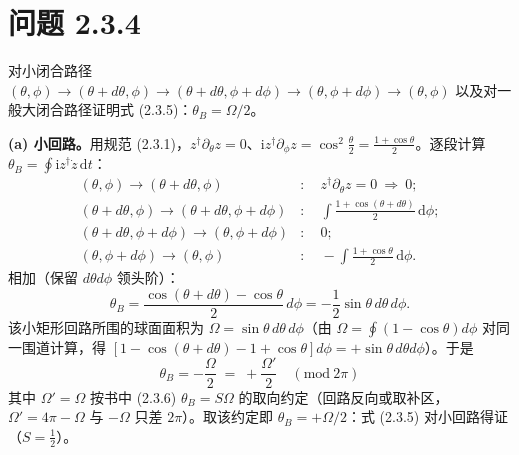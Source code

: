 \section*{问题 2.3.4}
\begin{problem}
对小闭合路径 $(\theta,\phi)\to(\theta+d\theta,\phi)\to(\theta+d\theta,\phi+d\phi)\to(\theta,\phi+d\phi)\to(\theta,\phi)$ 以及对一般大闭合路径证明式 (2.3.5)：$\theta_B=\Omega/2$。
\end{problem}
\solution
\textbf{(a) 小回路。}用规范 (2.3.1)，$z^\dagger\partial_\theta z=0$、$\mathrm{i}z^\dagger\partial_\phi z=\cos^2\frac\theta2=\frac{1+\cos\theta}2$。逐段计算 $\theta_B=\oint\mathrm{i}z^\dagger\dot z\,\mathrm{d}t$：
\begin{align*}
(\theta,\phi)\to(\theta+d\theta,\phi)&:\quad z^\dagger\partial_\theta z=0\ \Rightarrow\ 0;\\
(\theta+d\theta,\phi)\to(\theta+d\theta,\phi+d\phi)&:\quad \int\frac{1+\cos(\theta+d\theta)}2\,\mathrm{d}\phi;\\
(\theta+d\theta,\phi+d\phi)\to(\theta,\phi+d\phi)&:\quad 0;\\
(\theta,\phi+d\phi)\to(\theta,\phi)&:\quad -\int\frac{1+\cos\theta}2\,\mathrm{d}\phi .
\end{align*}
相加（保留 $d\theta d\phi$ 领头阶）：
\begin{equation*}
\theta_B=\frac{\cos(\theta+d\theta)-\cos\theta}{2}\,d\phi=-\frac12\sin\theta\,d\theta\,d\phi .
\end{equation*}
该小矩形回路所围的球面面积为 $\Omega=\sin\theta\,d\theta\,d\phi$（由 $\Omega=\oint(1-\cos\theta)d\phi$ 对同一围道计算，得 $[1-\cos(\theta+d\theta)-1+\cos\theta]d\phi=+\sin\theta\,d\theta d\phi$）。于是
\begin{equation*}
\boxed{\;\theta_B=-\frac{\Omega}{2}\;=\;+\frac{\Omega'}{2}\quad(\mathrm{mod}\ 2\pi)\;}
\end{equation*}
其中 $\Omega'=\Omega$ 按书中 (2.3.6) $\theta_B=S\Omega$ 的取向约定（回路反向或取补区，$\Omega'=4\pi-\Omega$ 与 $-\Omega$ 只差 $2\pi$）。取该约定即 $\theta_B=+\Omega/2$：式 (2.3.5) 对小回路得证（$S=\frac12$）。

